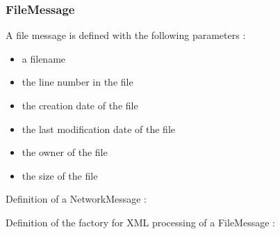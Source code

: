 \documentclass[letterpaper,10pt,english]{sphinxmanual}
\begin{document}
\subsubsection{FileMessage}
\label{import/index:filemessage}
A file message is defined with the following parameters :
\begin{itemize}
\item {} 
a filename

\item {} 
the line number in the file

\item {} 
the creation date of the file

\item {} 
the last modification date of the file

\item {} 
the owner of the file

\item {} 
the size of the file

\end{itemize}

Definition of a NetworkMessage :
\label{import/index:module-netzob.Common.Models.FileMessage}

\begin{fulllineitems}
\label{import/index:netzob.Common.Models.FileMessage.FileMessage}
\end{fulllineitems}


Definition of the factory for XML processing of a FileMessage :
\label{import/index:module-netzob.Common.Models.Factories.FileMessageFactory}

\begin{fulllineitems}
\label{import/index:netzob.Common.Models.Factories.FileMessageFactory.FileMessageFactory}
\end{fulllineitems}
\end{document}
